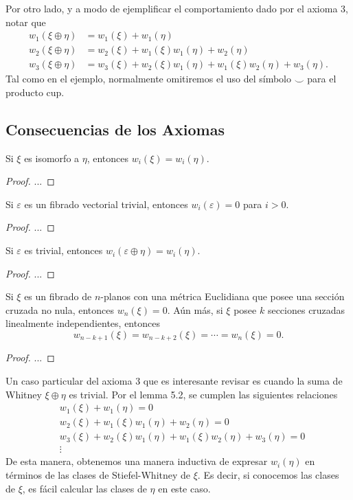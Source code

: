 Por otro lado, y a modo de ejemplificar el comportamiento dado por el axioma 3, notar que
\begin{align*}
	w_{1}(\xi \oplus \eta) &= w_{1}(\xi) + w_{1}(\eta) \\
	w_{2}(\xi \oplus \eta) &= w_{2}(\xi) + w_{1}(\xi)w_{1}(\eta) + w_{2}(\eta) \\
	w_{3}(\xi \oplus \eta) &= w_{3}(\xi) + w_{2}(\xi)w_{1}(\eta) + w_{1}(\xi)w_{2}(\eta) + w_{3}(\eta).
\end{align*}
Tal como en el ejemplo, normalmente omitiremos el uso del símbolo $\smile$ para el producto cup.

\subsection{Consecuencias de los Axiomas}

\begin{lemma}
	Si $\xi$ es isomorfo a $\eta$, entonces $w_{i}(\xi) = w_{i}(\eta)$.
\end{lemma}
\begin{proof}
	...
\end{proof}

\begin{lemma}
	Si $\varepsilon$ es un fibrado vectorial trivial, entonces $w_{i}(\varepsilon) = 0$ para $i > 0$.
\end{lemma}
\begin{proof}
	...
\end{proof}

\begin{lemma}
	Si $\varepsilon$ es trivial, entonces $w_{i}(\varepsilon \oplus \eta) = w_{i}(\eta)$.
\end{lemma}
\begin{proof}
	...
\end{proof}

\begin{lemma}
	Si $\xi$ es un fibrado de $n$-planos con una métrica Euclidiana que posee una sección cruzada no nula, entonces $w_{n}(\xi) = 0$. Aún más, si $\xi$ posee $k$ secciones cruzadas linealmente independientes, entonces
	\[ w_{n-k+1}(\xi) = w_{n-k+2}(\xi) = \cdots = w_{n}(\xi) = 0. \]
\end{lemma}
\begin{proof}
	...
\end{proof}

Un caso particular del axioma 3 que es interesante revisar es cuando la suma de Whitney $\xi \oplus \eta$ es trivial. Por el lemma 5.2, se cumplen las siguientes relaciones
\begin{align*}
	& w_{1}(\xi) + w_{1}(\eta) = 0 \\
	& w_{2}(\xi) + w_{1}(\xi) w_{1}(\eta) + w_{2}(\eta) = 0 \\
	& w_{3}(\xi) + w_{2}(\xi) w_{1}(\eta) + w_{1}(\xi) w_{2}(\eta) + w_{3}(\eta) = 0 \\
	& \vdots
\end{align*}
De esta manera, obtenemos una manera inductiva de expresar $w_{i}(\eta)$ en términos de las clases de Stiefel-Whitney de $\xi$. Es decir, si conocemos las clases de $\xi$, es fácil calcular las clases de $\eta$ en este caso. \par

